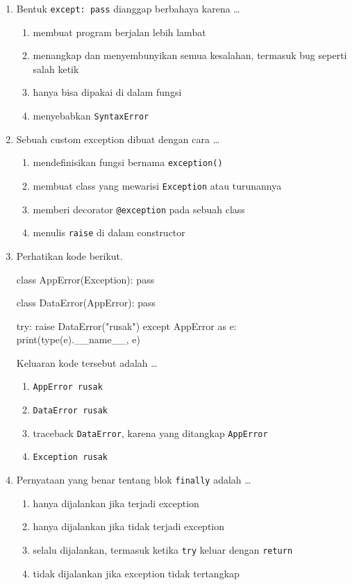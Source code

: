 \begin{enumerate}
  \item Bentuk \texttt{except: pass} dianggap berbahaya karena \ldots
  \begin{enumerate}[label=\alph*.,itemsep=0pt]
    \item membuat program berjalan lebih lambat
    \item menangkap dan menyembunyikan semua kesalahan, termasuk bug seperti salah ketik
    \item hanya bisa dipakai di dalam fungsi
    \item menyebabkan \texttt{SyntaxError}
  \end{enumerate}

  \item Sebuah custom exception dibuat dengan cara \ldots
  \begin{enumerate}[label=\alph*.,itemsep=0pt]
    \item mendefinisikan fungsi bernama \texttt{exception()}
    \item membuat class yang mewarisi \texttt{Exception} atau turunannya
    \item memberi decorator \texttt{@exception} pada sebuah class
    \item menulis \texttt{raise} di dalam constructor
  \end{enumerate}

  \item Perhatikan kode berikut.
\begin{kode}[Soal 7]
class AppError(Exception):
    pass

class DataError(AppError):
    pass

try:
    raise DataError("rusak")
except AppError as e:
    print(type(e).__name__, e)
\end{kode}
  Keluaran kode tersebut adalah \ldots
  \begin{enumerate}[label=\alph*.,itemsep=0pt]
    \item \texttt{AppError rusak}
    \item \texttt{DataError rusak}
    \item traceback \texttt{DataError}, karena yang ditangkap \texttt{AppError}
    \item \texttt{Exception rusak}
  \end{enumerate}

  \item Pernyataan yang benar tentang blok \texttt{finally} adalah \ldots
  \begin{enumerate}[label=\alph*.,itemsep=0pt]
    \item hanya dijalankan jika terjadi exception
    \item hanya dijalankan jika tidak terjadi exception
    \item selalu dijalankan, termasuk ketika \texttt{try} keluar dengan \texttt{return}
    \item tidak dijalankan jika exception tidak tertangkap
  \end{enumerate}


\end{enumerate}
